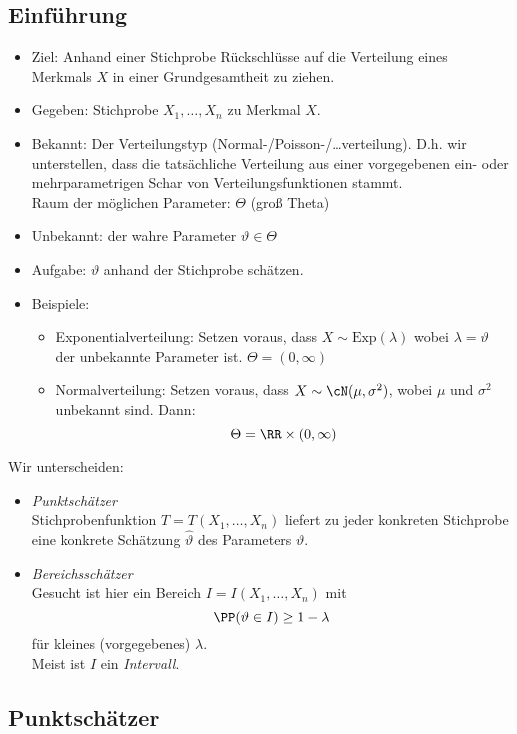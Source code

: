 \subsection{Einführung}
\begin{itemize}
\item Ziel: Anhand einer Stichprobe Rückschlüsse auf die Verteilung eines Merkmals $X$ in einer Grundgesamtheit zu ziehen.
\item Gegeben: Stichprobe $X_1,\ldots, X_n$ zu Merkmal $X$.
\item Bekannt: Der Verteilungstyp (Normal-/Poisson-/…verteilung). D.h. wir unterstellen, dass die tatsächliche Verteilung aus einer vorgegebenen ein- oder mehrparametrigen Schar von Verteilungsfunktionen stammt.\\
Raum der möglichen Parameter: $\Theta$ (groß Theta)
\item Unbekannt: der wahre Parameter $\vartheta \in \Theta$
\item Aufgabe: $\vartheta$ anhand der Stichprobe schätzen.
\item Beispiele: 
\begin{itemize}
\item Exponentialverteilung: Setzen voraus, dass $X\sim \mathrm{Exp}(\lambda)$ wobei $\lambda = \vartheta$ der unbekannte Parameter ist. $\Theta =(0,\infty) $
\item Normalverteilung: Setzen voraus, dass $X\sim \cN (\mu, \sigma^2)$, wobei $\mu$ und $\sigma^2$ unbekannt sind. Dann:
$$\Theta = \RR \times (0,\infty)$$
\end{itemize}
\end{itemize}
Wir unterscheiden:
\begin{itemize}
\item \emph{Punktschätzer}\\
Stichprobenfunktion $T=T(X_1,\ldots, X_n)$ liefert zu jeder konkreten Stichprobe eine konkrete Schätzung $\hat{\vartheta}$ des Parameters $\vartheta$.
\item \emph{Bereichsschätzer}\\
Gesucht ist hier ein Bereich $I=I(X_1,\ldots, X_n)$ mit 
$$\PP(\vartheta \in I) \geq 1-\lambda$$
für kleines (vorgegebenes) $\lambda$.\\
Meist ist $I$ ein \emph{Intervall}.
\end{itemize}

\subsection{Punktschätzer}

